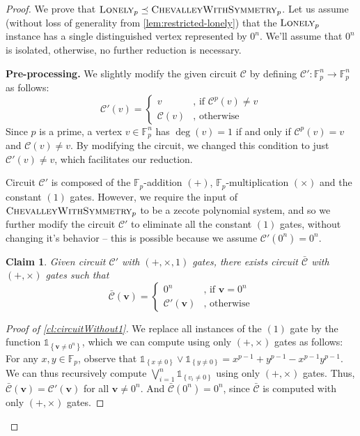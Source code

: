\documentclass[10pt,a4paper]{article}
\newtheorem{claim}[theorem]{Claim}
\theoremstyle{definition}
\theoremstyle{remark}
\newcommand{\infork}[1]{\left \{ \begin{matrix} #1 \end{matrix} \right .}
\def\set#1{\left\{#1\right\}}
\newcommand{\paragr}[1]{\noindent \textbf{\boldmath #1}}
\newcommand{\bbF}{\ensuremath{\mathbb{F}}}
\newcommand{\calC}{\mathcal{C}}
\newcommand{\vecv}{\ensuremath{\boldsymbol{v}}}
\newcommand{\pnum}{p}
\newcommand{\lonelyp}{\ensuremath\textsc{Lonely}_{\pnum}}
\newcommand{\reducible}{\preceq}
\newcommand{\cChevalleyp}{\textsc{ChevalleyWithSymmetry}_{\pnum}}
\begin{document}
\begin{proof}    We prove that $\lonelyp \reducible \cChevalleyp$. Let us assume (without loss of
    generality from \autoref{lem:restricted-lonely}) that the $\lonelyp$
    instance has a single distinguished vertex represented by $0^n$. We'll assume that $0^n$ is isolated, otherwise, no further reduction is necessary.\medskip

    \paragr{Pre-processing.} We slightly
    modify the given circuit $\calC$ by defining
    $\calC': \bbF_p^n \to \bbF_p^n$ as follows:
    \[ \calC'(v) = \left\{
                \begin{array}{cl}
                  v         &     \text{, if } \calC^p(v) \neq v \\
                  \calC(v)  &     \text{, otherwise}
                \end{array}
                \right.
    \]
    Since $p$ is a prime, a vertex $v \in \bbF_p^n$ has $\deg(v) = 1$ if and only if
    $\calC^p(v) = v$ and $\calC(v) \neq v$. By modifying the circuit, we changed this
    condition to just $\calC'(v) \neq v$, which facilitates our reduction.

    Circuit
    $\calC'$ is composed of the $\bbF_p$-addition $(+)$, $\bbF_p$-multiplication $(\times)$
    and the constant $(1)$ gates. However, we require the input of $\cChevalleyp$ to be a
    zecote polynomial system, and so we further modify the circuit $\calC'$ to eliminate all the constant $(1)$ gates, without changing it's behavior -- this is possible because we assume $\calC'(0^n) = 0^n$.
                \begin{claim}
        \label{cl:circuitWithout1}
          Given circuit $\calC'$ with $(+,\times, 1)$ gates, there exists circuit
          $\bar{\calC}$ with $(+, \times)$ gates such that
          \[ \bar{\calC}(\vecv) = \infork{0^n & \text{, if } \vecv = 0^n \\ \calC'(\vecv) & \text{, otherwise}}
          \]
    \end{claim}
    \begin{proof}[Proof of \autoref{cl:circuitWithout1}]
    	We replace all instances of the $(1)$ gate by the function $\mathds{1}_{\set{\vecv \ne 0^n}}$, which we can compute using only $(+, \times)$ gates as follows: For any $x, y \in \bbF_p$, observe that $\mathds{1}_{\set{x \ne 0}} \vee \mathds{1}_{\set{y \ne 0}} = x^{p-1} + y^{p-1} - x^{p-1} y^{p-1}$. We can thus recursively compute $\bigvee_{i=1}^n \mathds{1}_{\set{v_i \ne 0}}$ using only $(+, \times)$ gates. Thus, $\bar{\calC}(\vecv) = \calC'(\vecv)$ for all $\vecv \ne 0^n$. And $\bar{\calC}(0^n) = 0^n$, since $\bar{\calC}$ is computed with only $(+, \times)$ gates.
    \end{proof}


\end{proof}
\end{document}
